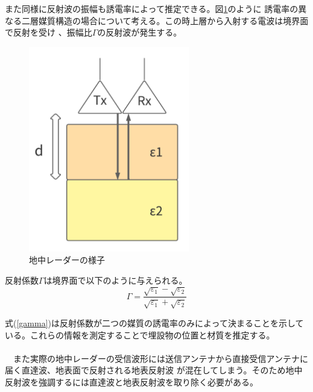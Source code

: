 \documentclass[a4paper,12pt]{jsreport}
\begin{document}
また同様に反射波の振幅も誘電率によって推定できる。図\ref{地中レーダーの様子}のように
誘電率の異なる二層媒質構造の場合について考える。この時上層から入射する電波は境界面で反射を受け
、振幅比$\Gamma$の反射波が発生する。

\begin{figure}[h]
  \begin{center}
   \includegraphics[width=7cm]{./image/antenna_depth_2.pdf}
   
  \caption{地中レーダーの様子}\label{地中レーダーの様子}
  \end{center}
  \end{figure}

反射係数$\Gamma$は境界面で以下のように与えられる。
\begin{equation}
  \Gamma=
  \frac{\sqrt{\varepsilon_{1}}-\sqrt{\varepsilon_{2}}}{\sqrt{\varepsilon_{1}}+\sqrt{\varepsilon_{2}}} 
\label{gamma}  
\end{equation}


式(\ref{gamma})は反射係数が二つの媒質の誘電率のみによって決まることを示している。これらの情報を測定することで埋設物の位置と材質を推定する。
\\
\\　また実際の地中レーダーの受信波形には送信アンテナから直接受信アンテナに届く直達波、地表面で反射される地表反射波
が混在してしまう。そのため地中反射波を強調するには直達波と地表反射波を取り除く必要がある。
\end{document}
